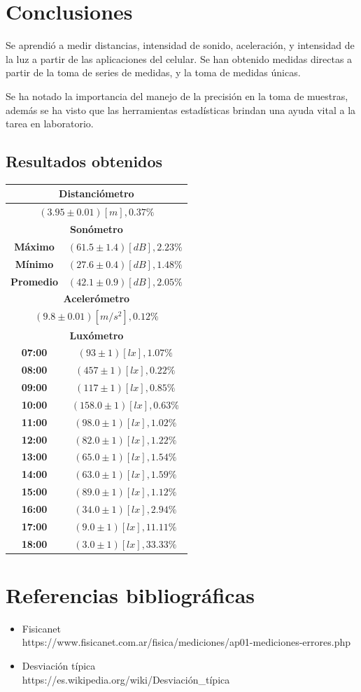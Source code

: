 \documentclass[letter,11pt]{article}
\begin{document}
\section{Conclusiones}
Se aprendió a medir distancias, intensidad de sonido, aceleración, y intensidad
de la luz a partir de las aplicaciones del celular. Se han obtenido medidas
directas a partir de la toma de series de medidas, y la toma de medidas únicas.

Se ha notado la importancia del manejo de la precisión en la toma de muestras,
además se ha visto que las herramientas estadísticas brindan una ayuda vital a
la tarea en laboratorio.

\subsection{Resultados obtenidos}

\begin{center}
\begin{tabular}{|c|c|}
\hline
\multicolumn{2}{|c|}{\textbf{Distanciómetro}} \\
\hline
\multicolumn{2}{|c|}{$(3.95\pm0.01)[m], 0.37\%$} \\
\hline
\multicolumn{2}{|c|}{\textbf{Sonómetro}} \\
\hline
\textbf{Máximo} & $(61.5\pm1.4)[dB], 2.23\%$ \\
\textbf{Mínimo} & $(27.6\pm0.4)[dB], 1.48\%$ \\
\textbf{Promedio} & $(42.1\pm0.9)[dB], 2.05\%$ \\
\hline
\multicolumn{2}{|c|}{\textbf{Acelerómetro}} \\
\hline
\multicolumn{2}{|c|}{$(9.8\pm0.01)[m/s^2], 0.12\%$} \\
\hline
\multicolumn{2}{|c|}{\textbf{Luxómetro}} \\
\hline
\textbf{07:00} & $(93\pm1)[lx], 1.07\%$ \\
\textbf{08:00} & $(457\pm1)[lx], 0.22\%$ \\
\textbf{09:00} & $(117\pm1)[lx], 0.85\%$ \\
\textbf{10:00} & $(158.0\pm1)[lx], 0.63\%$ \\
\textbf{11:00} & $(98.0\pm1)[lx], 1.02\%$ \\
\textbf{12:00} & $(82.0\pm1)[lx], 1.22\%$ \\
\textbf{13:00} & $(65.0\pm1)[lx], 1.54\%$ \\
\textbf{14:00} & $(63.0\pm1)[lx], 1.59\%$ \\
\textbf{15:00} & $(89.0\pm1)[lx], 1.12\%$ \\
\textbf{16:00} & $(34.0\pm1)[lx], 2.94\%$ \\
\textbf{17:00} & $(9.0\pm1)[lx], 11.11\%$ \\
\textbf{18:00} & $(3.0\pm1)[lx], 33.33\%$ \\
\hline
\end{tabular}
\end{center}

\section{Referencias bibliográficas}
\begin{itemize}
\item Fisicanet \\
https://www.fisicanet.com.ar/fisica/mediciones/ap01-mediciones-errores.php
\item Desviación típica \\
https://es.wikipedia.org/wiki/Desviación\_típica
\end{itemize}
\end{document}
